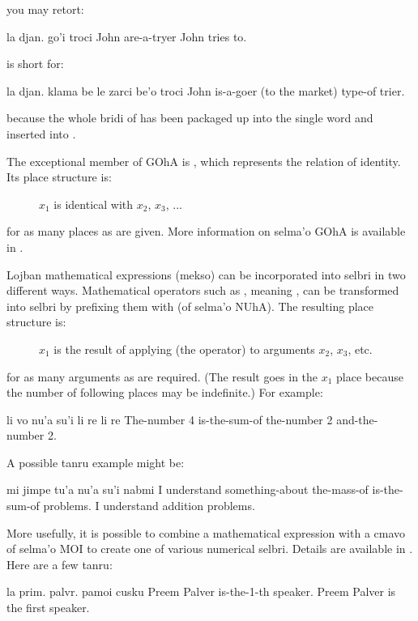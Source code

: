{\noindent}you may retort:
\begin{example}
la djan. go'i troci\n
John  are-a-tryer\n
John tries to.
\end{example}

 is short for:
\begin{example}
la djan. klama be le zarci be'o troci\n
John is-a-goer (to the market) type-of trier.
\end{example}

{\noindent}because the whole bridi of  has
    been packaged up into the single word  and inserted
    into . 

The exceptional member of GOhA is , which represents
    the relation of identity. Its place structure is:
\begin{description}
\item[] $x_1$ is identical with $x_2$, $x_3$, ...
\end{description}

for as many places as are given. More information on selma'o
    GOhA is available in . 

Lojban mathematical expressions (mekso) can be incorporated
    into selbri in two different ways. Mathematical operators such
    as , meaning , can be transformed into selbri
    by prefixing them with  (of selma'o NUhA). The
    resulting place structure is:
\begin{description}
\item[] $x_1$ is the result of applying (the operator) to arguments $x_2$, $x_3$, etc.
\end{description}

for as many arguments as are required. (The result goes in the
    $x_1$ place because the number of following places may be
    indefinite.) For example:
\begin{example}
li vo nu'a su'i li re li re\n
The-number 4 is-the-sum-of the-number 2 and-the-number 2.
\end{example}

A possible tanru example might be:
\begin{example}
mi jimpe tu'a nu'a su'i nabmi\n
I understand something-about the-mass-of is-the-sum-of problems.\n
I understand addition problems.
\end{example}

More usefully, it is possible to combine a mathematical
    expression with a cmavo of selma'o MOI to create one of various
    numerical selbri. Details are available in . Here are a few tanru:
\begin{example}
la prim. palvr. pamoi cusku\n
Preem Palver is-the-1-th speaker.\n
Preem Palver is the first speaker.
\end{example}

